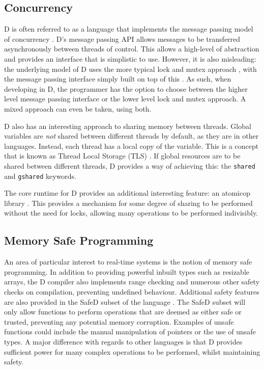 \subsection{Concurrency}
D is often referred to as a language that implements the message passing model 
of concurrency \cite{ddili-book}. D's message passing API 
allows messages to be transferred asynchronously between threads of control.
This allows a high-level of abstraction and provides an 
interface that is simplistic to use. However, it is also misleading: the underlying 
model of D uses the more typical lock and mutex approach 
\cite{dlang-github-mutex}, 
with the message passing interface simply built on top of this 
\cite{dlang-github-concurrency}. 
As such, when developing in D, the programmer has the option to choose between 
the higher level message passing interface or the lower level lock and mutex 
approach. A mixed approach can even be taken, using both. 
\par\bigskip\noindent
D also has an interesting approach to sharing memory between threads. 
Global variables are \emph{not} shared between different threads by default, as 
they are in other languages. Instead, each thread has a local copy of the variable. 
This is a concept that is known as Thread Local Storage (TLS) 
\cite{migrate-to-shared}. 
If global resources are to be shared between different threads, D provides a way of 
achieving this: the \texttt{shared} and
\texttt{\textunderscore{}\textunderscore{}gshared} keywords.
\par\bigskip\noindent
The core runtime for D provides an additional interesting feature: an atomicop 
library \cite{core-atomic}. 
This provides a mechanism for some degree of sharing to be performed without the 
need for locks, allowing many operations to be performed indivisibly.

\subsection{Memory Safe Programming}
An area of particular interest to real-time systems is the notion of memory 
safe programming. In addition to providing powerful inbuilt types such as 
resizable arrays, the D compiler also implements range checking and numerous other 
safety checks on compilation, preventing undefined behaviour.
Additional safety features are also provided in the SafeD subset of the language
\cite{safe-d}. The SafeD subset will only allow functions to perform 
operations that are deemed as either safe or trusted, preventing any 
potential memory corruption. Examples of unsafe functions could include the 
manual manipulation of pointers or the use of unsafe types. A major difference 
with regards to other languages is that D provides sufficient power for many complex 
operations to be performed, whilst maintaining safety.

